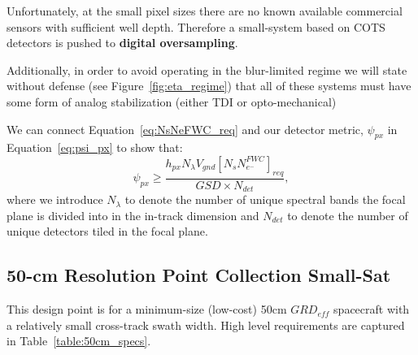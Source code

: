 \documentclass[10pt,journal]{IEEEtran}  %
\begin{document}
Unfortunately, at the small pixel sizes there are no known available commercial sensors with sufficient well depth. Therefore a small-system based on COTS detectors is pushed to \textbf{digital oversampling}.  

Additionally, in order to avoid operating in the blur-limited regime we will state without defense (see Figure~\ref{fig:eta_regime}) that all of these systems must have some form of analog stabilization (either TDI or opto-mechanical)

We can connect Equation~\eqref{eq:NsNeFWC_req} and our detector metric, $\psi_{px}$ in Equation~\eqref{eq:psi_px} to show that:
\begin{equation}
    \psi_{px} \geq \frac{h_{px} N_{\lambda} V_{gnd} \left[N_sN_{e^-}^{FWC}\right]_{req}}{GSD \times N_{det}}
    \label{eq:psi_px_req},
\end{equation}
where we introduce $N_{\lambda}$ to denote the number of unique spectral bands the focal plane is divided into in the in-track dimension and $N_{det}$ to denote the number of unique detectors tiled in the focal plane.

\subsection{50-cm Resolution Point Collection Small-Sat}

This design point is for a minimum-size (low-cost) 50cm $GRD_{eff}$ spacecraft with a relatively small cross-track swath width.  High level requirements are captured in Table~\ref{table:50cm_specs}.

\begin{table}[ht]
\centering
{}
\caption{Specification for 50-cm small-sat point collector.}
\label{table:50cm_specs}
\end{table}
\end{document}
